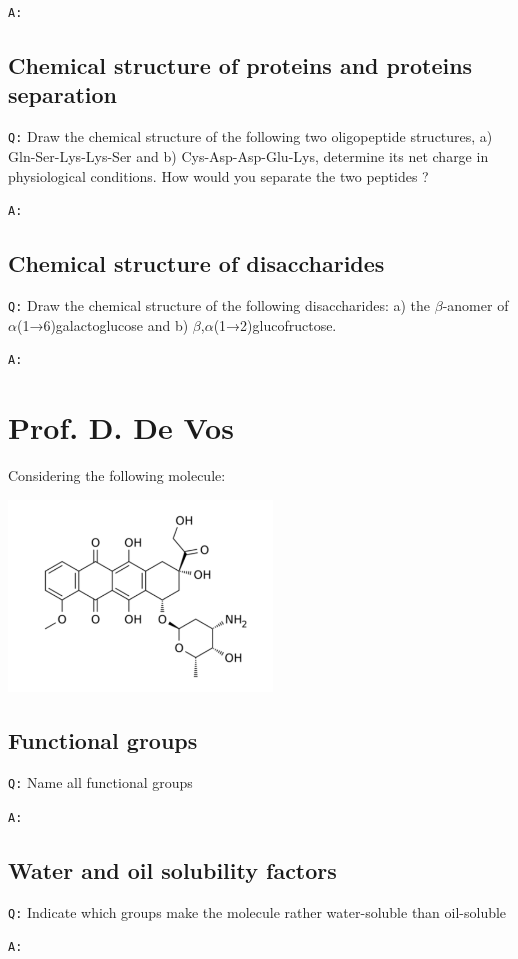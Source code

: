 \documentclass[11pt, a4paper,titlepage]{article}
\begin{document}
\texttt{A:}
\subsection{Chemical structure of proteins and proteins separation}
\label{sec-2-2}

\texttt{Q:} Draw the chemical structure of the following two oligopeptide
structures, a) Gln-Ser-Lys-Lys-Ser and b) Cys-Asp-Asp-Glu-Lys,
determine its net charge in physiological conditions. How would you
separate the two peptides ?  

\texttt{A:}
\subsection{Chemical structure of disaccharides}
\label{sec-2-3}

\texttt{Q:} Draw the chemical structure of the following disaccharides: a)
the $\beta$-anomer of $\alpha$(1→6)galactoglucose and b)
$\beta$,$\alpha$(1→2)glucofructose.

\texttt{A:}
\section{Prof. D. De Vos}
\label{sec-3}

Considering the following molecule:

\includegraphics[width=7cm]{./Figures/Part3MoleculeRaw.pdf}
\subsection{Functional groups}
\label{sec-3-1}

\texttt{Q:} Name all functional groups

\texttt{A:}
\subsection{Water and oil solubility factors}
\label{sec-3-2}

\texttt{Q:} Indicate which groups make the molecule rather water-soluble
than oil-soluble

\texttt{A:}
\end{document}
